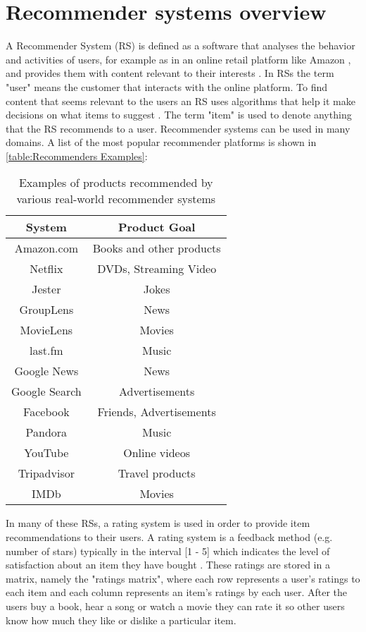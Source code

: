 
\section{Recommender systems overview}
A Recommender System (RS) is defined as a software that analyses the behavior
and activities of users, for example as in an online retail platform like
Amazon \citep{amazon}, and provides them with content relevant to their
interests \citep{Ricci, Jannach}. In RSs the term "user" means the customer
that interacts with the online platform. To find content that seems relevant
to the users an RS uses algorithms that help it make decisions on what
items to suggest \citep{Ricci}. The term "item" is used to denote anything
that the RS recommends to a user. Recommender systems can be used in many domains.
A list of the most popular recommender platforms is shown in \autoref{table:Recommenders Examples}:

\begin{table}[H]
\centering
\caption{Examples of products recommended by various real-world recommender
         systems \citep{Aggarwal}}
\label{table:Recommenders Examples}
\begin{tabular}{ |c|c| }
\hline
\textbf{System} & \textbf{Product Goal}\\
\hline
Amazon.com & Books and other products\\
\hline
Netflix & DVDs, Streaming Video\\
\hline
Jester & Jokes\\
\hline
GroupLens & News\\
\hline
MovieLens & Movies\\
\hline
last.fm & Music\\
\hline
Google News & News\\
\hline
Google Search & Advertisements\\
\hline
Facebook & Friends, Advertisements\\
\hline
Pandora & Music\\
\hline
YouTube & Online videos\\
\hline
Tripadvisor & Travel products\\
\hline
IMDb & Movies\\
\hline
\end{tabular}
\end{table}

In many of these RSs, a rating system is used in order to provide item
recommendations to their users. A rating system is a feedback method
(e.g. number of stars) typically in the interval [1 - 5] which indicates the
level of satisfaction about an item they have bought \citep{Aggarwal}.
These ratings are stored in a matrix, namely the "ratings matrix", where
each row represents a user's ratings to each item and each column represents
an item's ratings by each user.
After the users buy a book, hear a song or watch a movie they can rate it so
other users know how much they like or dislike a particular item.


